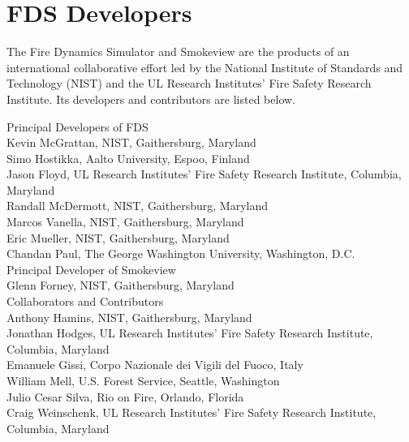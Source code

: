 \chapter{FDS Developers}

The Fire Dynamics Simulator and Smokeview are the products of an international collaborative effort led by
the National Institute of Standards and Technology (NIST) and the UL Research Institutes' Fire Safety Research Institute. Its developers and
contributors are listed below.

\vspace{0.3in}

\begin{flushleft}

Principal Developers of FDS  \\ [0.2in]

Kevin McGrattan, NIST, Gaithersburg, Maryland \\
Simo Hostikka, Aalto University, Espoo, Finland \\
Jason Floyd, UL Research Institutes' Fire Safety Research Institute, Columbia, Maryland \\
Randall McDermott, NIST, Gaithersburg, Maryland \\
Marcos Vanella, NIST, Gaithersburg, Maryland \\
Eric Mueller, NIST, Gaithersburg, Maryland \\
Chandan Paul, The George Washington University, Washington, D.C. \\ [0.3in]

Principal Developer of Smokeview  \\ [0.2in]

Glenn Forney, NIST, Gaithersburg, Maryland \\ [0.3in]

Collaborators and Contributors \\ [0.2in]

Anthony Hamins, NIST, Gaithersburg, Maryland \\
Jonathan Hodges, UL Research Institutes' Fire Safety Research Institute, Columbia, Maryland \\
Emanuele Gissi, Corpo Nazionale dei Vigili del Fuoco, Italy \\
William Mell, U.S. Forest Service, Seattle, Washington \\
Julio Cesar Silva, Rio on Fire, Orlando, Florida  \\
Craig Weinschenk, UL Research Institutes' Fire Safety Research Institute, Columbia, Maryland

\end{flushleft}

